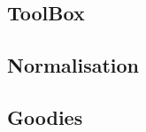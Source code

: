 \addtocounter{off}{4}

\subsection{ToolBox}

\addtocounter{off}{3}

\addtocounter{off}{3}

\addtocounter{off}{3}

\subsection{Normalisation}

\addtocounter{off}{3}

\addtocounter{off}{3}

\addtocounter{off}{3}

\subsection{Goodies}

\addtocounter{off}{3}

\addtocounter{off}{7}
